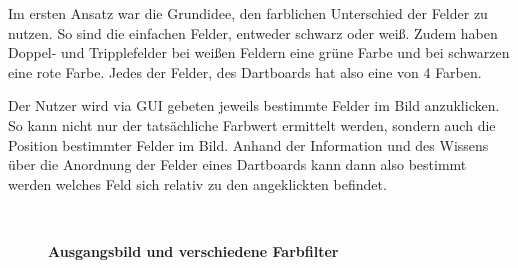 Im ersten Ansatz war die Grundidee, den farblichen Unterschied der Felder zu nutzen. So sind die einfachen Felder, entweder schwarz oder weiß. Zudem haben Doppel- und Tripplefelder bei weißen Feldern eine grüne Farbe und bei schwarzen eine rote Farbe. 
Jedes der Felder, des Dartboards hat also eine von 4 Farben. 

Der Nutzer wird via GUI gebeten jeweils bestimmte Felder im Bild anzuklicken. So kann nicht nur der tatsächliche Farbwert ermittelt werden, sondern auch die Position bestimmter Felder im Bild. Anhand der Information und des Wissens über die Anordnung der Felder eines Dartboards kann dann also bestimmt werden welches Feld sich relativ zu den angeklickten befindet. 
\begin{figure}[ht]
\qquad
{}\\
\qquad
{}
\caption{\textbf{Ausgangsbild und verschiedene Farbfilter}}
\label{Fig:dartblobs}
\end{figure}
